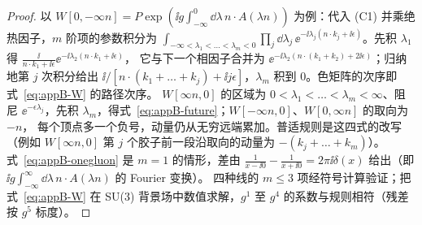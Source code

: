 \begin{proof}
以 $W[0,-\infty n]=P\exp(\ii g\int_{-\infty}^0\dd\lambda\,n\cdot A(\lambda n))$ 为例：代入 (C1) 并乘绝热因子，$m$ 阶项的参数积分为
$\int_{-\infty<\lambda_1<\dots<\lambda_m<0}\prod_j\dd\lambda_j\,\ee^{-\ii\lambda_j(n\cdot k_j+\ii\epsilon)}$。先积 $\lambda_1$ 得 $\frac{\ii}{n\cdot k_1+\ii\epsilon}\ee^{-\ii\lambda_2(n\cdot k_1+\ii\epsilon)}$，
它与下一个相因子合并为 $\ee^{-\ii\lambda_2(n\cdot(k_1+k_2)+2\ii\epsilon)}$；归纳地第 $j$ 次积分给出 $\ii/[n\cdot(k_1+\dots+k_j)+\ii j\epsilon]$，$\lambda_m$ 积到 $0$。色矩阵的次序即式~\eqref{eq:appB-W} 的路径次序。
$W[\infty n,0]$ 的区域为 $0<\lambda_1<\dots<\lambda_m<\infty$、阻尼 $\ee^{-\epsilon\lambda_j}$，先积 $\lambda_m$，得式~\eqref{eq:appB-future}；$W[-\infty n,0]$、$W[0,\infty n]$ 的取向为 $-n$，
每个顶点多一个负号，动量仍从无穷远端累加。普适规则是这四式的改写（例如 $W[\infty n,0]$ 第 $j$ 个胶子前一段沿取向的动量为 $-(k_j+\dots+k_m)$）。
式~\eqref{eq:appB-onegluon} 是 $m=1$ 的情形，差由 $\frac1{x-\ii0}-\frac1{x+\ii0}=2\pi\ii\delta(x)$ 给出（即 $\ii g\int_{-\infty}^\infty\dd\lambda\,n\cdot A(\lambda n)$ 的 Fourier 变换）。
四种线的 $m\le3$ 项经符号计算验证；把式~\eqref{eq:appB-W} 在 SU(3) 背景场中数值求解，$g^1$ 至 $g^4$ 的系数与规则相符（残差按 $g^5$ 标度）。%
\end{proof}
